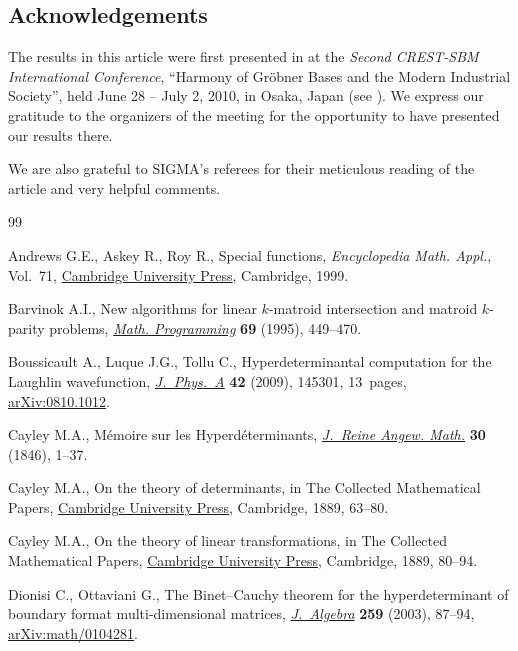 \documentclass[10pt,a4paper]{amsart}
\numberwithin{equation}{section}
\begin{document}
\subsection*{Acknowledgements}
The results in this article were first presented in \cite{Johnson_Richards} at the {\it Second CREST-SBM International Conference}, ``Harmony of Gr\"obner Bases and the Modern Industrial Society'', held June 28 -- July 2, 2010, in Osaka, Japan (see \cite{Hibi}). We express our gratitude to the organizers of the meeting for the opportunity to have presented our results there.

We are also grateful to SIGMA's referees for their meticulous reading of the article and very helpful comments.


\begin{thebibliography}{99}
\footnotesize\itemsep=0pt

Andrews G.E., Askey R., Roy R., Special functions, \textit{Encyclopedia Math.
 Appl.}, Vol.~71, \href{https://doi.org/10.1017/CBO9781107325937}{Cambridge
 University Press}, Cambridge, 1999.

Barvinok A.I., New algorithms for linear {$k$}-matroid intersection and matroid
 {$k$}-parity problems,
 \href{https://doi.org/10.1007/BF01585571}{\textit{Math. Programming}}
 \textbf{69} (1995), 449--470.

Boussicault A., Luque J.G., Tollu C., Hyperdeterminantal computation for the
 {L}aughlin wavefunction,
 \href{https://doi.org/10.1088/1751-8113/42/14/145301}{\textit{J.~Phys.~A}}
 \textbf{42} (2009), 145301, 13~pages,
 \href{http://arxiv.org/abs/0810.1012}{arXiv:0810.1012}.

Cayley M.A., M\'emoire sur les {H}yperd\'eterminants,
 \href{https://doi.org/10.1515/crll.1846.30.1}{\textit{J.~Reine Angew. Math.}}
 \textbf{30} (1846), 1--37.

Cayley M.A., On the theory of determinants, in The {C}ollected {M}athematical
 {P}apers, \href{https://doi.org/10.1017/CBO9780511703676.013}{Cambridge
 University Press}, Cambridge, 1889, 63--80.

Cayley M.A., On the theory of linear transformations, in The {C}ollected
 {M}athematical {P}apers,
 \href{https://doi.org/10.1017/CBO9780511703676.014}{Cambridge University
 Press}, Cambridge, 1889, 80--94.

Dionisi C., Ottaviani G., The {B}inet--{C}auchy theorem for the
 hyperdeterminant of boundary format multi-dimensional matrices,
 \href{https://doi.org/10.1016/S0021-8693(02)00537-9}{\textit{J.~Algebra}}
 \textbf{259} (2003), 87--94,
 \href{http://arxiv.org/abs/math/0104281}{arXiv:math/0104281}.


\end{thebibliography}
\end{document}
